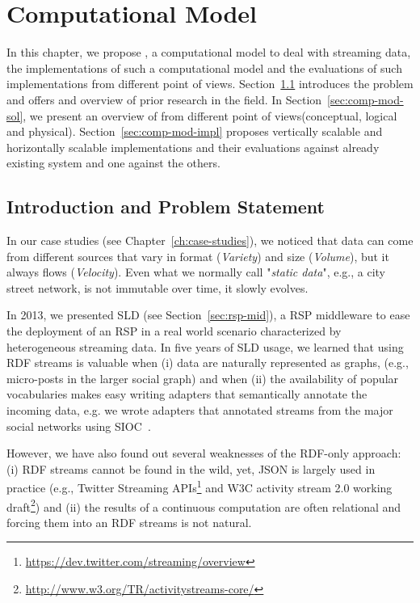 \chapter{Computational Model}\label{ch:computational}
In this chapter, we propose \river{}, a computational model to deal with streaming data, the implementations of such a computational model and the evaluations of such implementations from different point of views.
Section~\ref{sec:comp-mod-intro} introduces the problem and offers and overview of prior research in the field.
In Section~\ref{sec:comp-mod-sol}, we present an overview of \river{} from different point of views(conceptual, logical and physical).
Section~\ref{sec:comp-mod-impl} proposes vertically scalable and horizontally scalable implementations and their evaluations against already existing system and one against the others.

\section{Introduction and Problem Statement} \label{sec:comp-mod-intro}
In our case studies (see Chapter~\ref{ch:case-studies}), we noticed that data can come from different  sources that vary in format (\textit{Variety}) and size (\textit{Volume}), but it  always flows (\textit{Velocity}). Even what we normally call "\textit{static data}", e.g.,  a city street network, is not immutable over time, it  slowly evolves.

In 2013, we presented SLD (see Section~\ref{sec:rsp-mid}), a RSP middleware to ease the deployment of an RSP in a real world scenario characterized by heterogeneous streaming data.
In five years of SLD usage, we learned that using RDF streams is valuable when (i) data are naturally represented as graphs, (e.g., micro-posts in the larger social graph) and when (ii) the availability of popular vocabularies makes easy writing adapters that semantically annotate the incoming data, e.g. we wrote adapters that annotated streams from the major social networks using SIOC~\cite{DBLP:journals/ijwbc/BreslinDHB06}.

However, we have also found out several weaknesses of the RDF-only approach: (i) RDF streams cannot be found in the wild, yet, JSON is largely used in practice (e.g., Twitter Streaming APIs\footnote{\url{https://dev.twitter.com/streaming/overview}} and W3C activity stream 2.0 working draft\footnote{\url{http://www.w3.org/TR/activitystreams-core/}}) and (ii) the results of a continuous computation are often relational and forcing them into an RDF streams is not natural.

